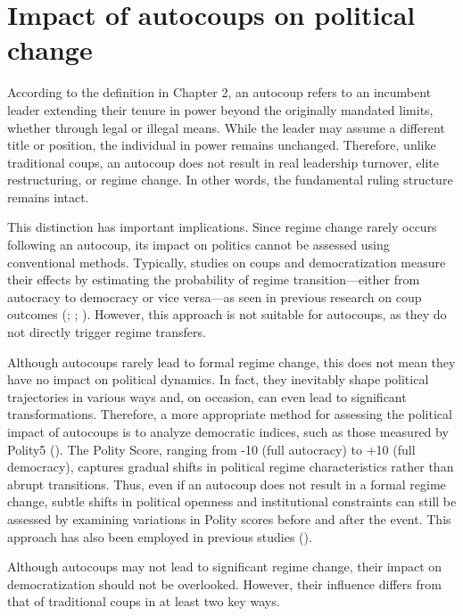 \documentclass[
  12pt,
]{report}
\begin{document}
\section{Impact of autocoups on political
change}\label{impact-of-autocoups-on-political-change}

According to the definition in Chapter 2, an autocoup refers to an
incumbent leader extending their tenure in power beyond the originally
mandated limits, whether through legal or illegal means. While the
leader may assume a different title or position, the individual in power
remains unchanged. Therefore, unlike traditional coups, an autocoup does
not result in real leadership turnover, elite restructuring, or regime
change. In other words, the fundamental ruling structure remains intact.

This distinction has important implications. Since regime change rarely
occurs following an autocoup, its impact on politics cannot be assessed
using conventional methods. Typically, studies on coups and
democratization measure their effects by estimating the probability of
regime transition---either from autocracy to democracy or vice
versa---as seen in previous research on coup outcomes
(;
;
). However, this approach is not
suitable for autocoups, as they do not directly trigger regime
transfers.

Although autocoups rarely lead to formal regime change, this does not
mean they have no impact on political dynamics. In fact, they inevitably
shape political trajectories in various ways and, on occasion, can even
lead to significant transformations. Therefore, a more appropriate
method for assessing the political impact of autocoups is to analyze
democratic indices, such as those measured by Polity5
(). The Polity Score,
ranging from -10 (full autocracy) to +10 (full democracy), captures
gradual shifts in political regime characteristics rather than abrupt
transitions. Thus, even if an autocoup does not result in a formal
regime change, subtle shifts in political openness and institutional
constraints can still be assessed by examining variations in Polity
scores before and after the event. This approach has also been employed
in previous studies ().

Although autocoups may not lead to significant regime change, their
impact on democratization should not be overlooked. However, their
influence differs from that of traditional coups in at least two key
ways.
\end{document}
